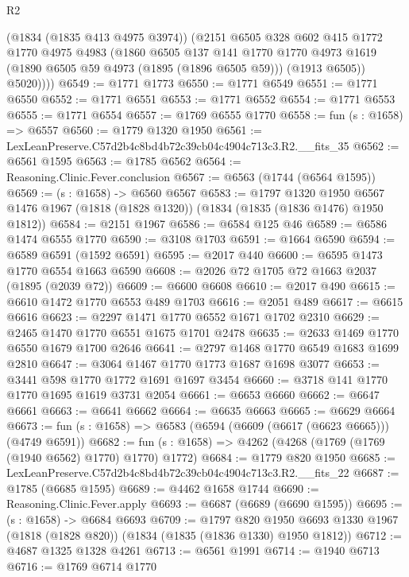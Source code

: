 \begin{lexlean}{R2}
\begin{coremodule}
          (@1834 (@1835 @413 @4975 @3974))
          (@2151
            @6505
            @328
            @602
            @415
            @1772
            @1770
            @4975
            @4983
            (@1860
              @6505
              @137
              @141
              @1770
              @1770
              @4973
              @1619
              (@1890 @6505 @59 @4973 (@1895 (@1896 @6505 @59)))
              (@1913 @6505))
            @5020))))
@6549 := @1771 @1773
@6550 := @1771 @6549
@6551 := @1771 @6550
@6552 := @1771 @6551
@6553 := @1771 @6552
@6554 := @1771 @6553
@6555 := @1771 @6554
@6557 := @1769 @6555 @1770
@6558 := fun (s : @1658) => @6557
@6560 := @1779 @1320 @1950
@6561 := LexLeanPreserve.C57d2b4c8bd4b72c39cb04c4904c713c3.R2.__fits_35
@6562 := @6561 @1595
@6563 := @1785 @6562
@6564 := Reasoning.Clinic.Fever.conclusion
@6567 := @6563 (@1744 (@6564 @1595))
@6569 := (s : @1658) -> @6560 @6567
@6583 := @1797
    @1320
    @1950
    @6567
    @1476
    @1967
    (@1818 (@1828 @1320))
    (@1834 (@1835 (@1836 @1476) @1950 @1812))
@6584 := @2151 @1967
@6586 := @6584 @125 @46
@6589 := @6586 @1474 @6555 @1770
@6590 := @3108 @1703
@6591 := @1664 @6590
@6594 := @6589 @6591 (@1592 @6591)
@6595 := @2017 @440
@6600 := @6595 @1473 @1770 @6554 @1663 @6590
@6608 := @2026 @72 @1705 @72 @1663 @2037 (@1895 (@2039 @72))
@6609 := @6600 @6608
@6610 := @2017 @490
@6615 := @6610 @1472 @1770 @6553 @489 @1703
@6616 := @2051 @489
@6617 := @6615 @6616
@6623 := @2297 @1471 @1770 @6552 @1671 @1702 @2310
@6629 := @2465 @1470 @1770 @6551 @1675 @1701 @2478
@6635 := @2633 @1469 @1770 @6550 @1679 @1700 @2646
@6641 := @2797 @1468 @1770 @6549 @1683 @1699 @2810
@6647 := @3064 @1467 @1770 @1773 @1687 @1698 @3077
@6653 := @3441 @598 @1770 @1772 @1691 @1697 @3454
@6660 := @3718 @141 @1770 @1770 @1695 @1619 @3731 @2054
@6661 := @6653 @6660
@6662 := @6647 @6661
@6663 := @6641 @6662
@6664 := @6635 @6663
@6665 := @6629 @6664
@6673 := fun (s : @1658) => @6583 (@6594 (@6609 (@6617 (@6623 @6665))) (@4749 @6591))
@6682 := fun (s : @1658) => @4262 (@4268 (@1769 (@1769 (@1940 @6562) @1770) @1770) @1772)
@6684 := @1779 @820 @1950
@6685 := LexLeanPreserve.C57d2b4c8bd4b72c39cb04c4904c713c3.R2.__fits_22
@6687 := @1785 (@6685 @1595)
@6689 := @4462 @1658 @1744
@6690 := Reasoning.Clinic.Fever.apply
@6693 := @6687 (@6689 (@6690 @1595))
@6695 := (s : @1658) -> @6684 @6693
@6709 := @1797
    @820
    @1950
    @6693
    @1330
    @1967
    (@1818 (@1828 @820))
    (@1834 (@1835 (@1836 @1330) @1950 @1812))
@6712 := @4687 @1325 @1328 @4261
@6713 := @6561 @1991
@6714 := @1940 @6713
@6716 := @1769 @6714 @1770

\end{coremodule}
\end{lexlean}
